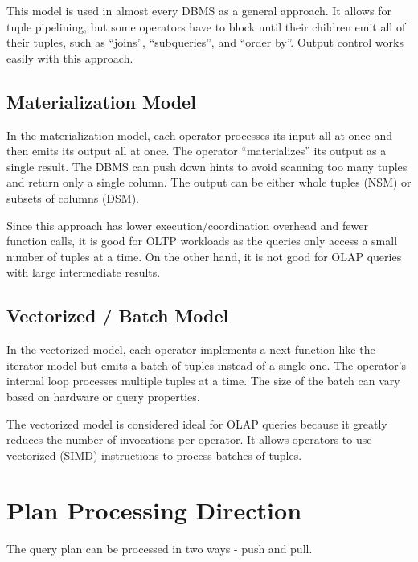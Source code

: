 \documentclass[11pt]{article}
\begin{document}
This model is used in almost every DBMS as a general approach. It allows for tuple pipelining, but 
some operators have to block until their children emit all of their tuples, such as ``joins'', 
``subqueries'', and ``order by''. Output control works easily with this approach.

\subsection{Materialization Model}
In the materialization model, each operator processes its input all at once and then emits its 
output all at once. The operator ``materializes'' its output as a single result. The DBMS can push 
down hints to avoid scanning too many tuples and return only a single column. The output can be 
either whole tuples (NSM) or subsets of columns (DSM). 

Since this approach has lower execution/coordination overhead and fewer function calls, it is 
good for OLTP workloads as the  queries only access a small number of tuples at a time. On the 
other hand, it is not good for OLAP queries with large intermediate results.

\subsection{Vectorized / Batch Model}
In the vectorized model, each operator implements a next function like the iterator model but emits 
a batch of tuples instead of a single one. The operator's internal loop processes multiple tuples 
at a time. The size of the batch can vary based on hardware or query properties.

The vectorized model is considered ideal for OLAP queries because it greatly reduces the number of 
invocations per operator. It allows operators to use vectorized (SIMD) instructions to process 
batches of tuples.

\section {Plan Processing Direction}
The query plan can be processed in two ways - push and pull.
\end{document}
